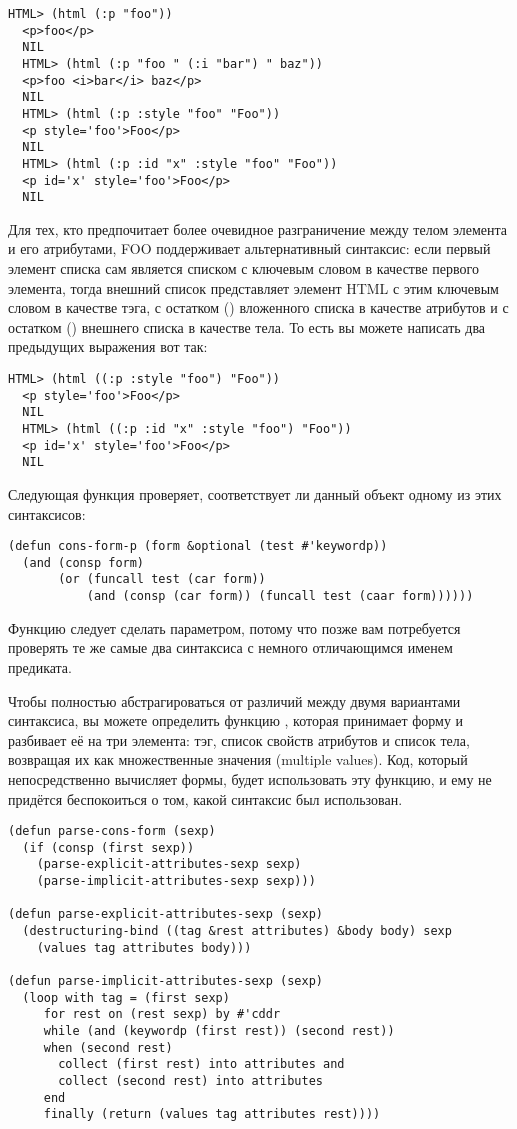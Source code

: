 \begin{lstlisting}[style=lisprepl]
  HTML> (html (:p "foo"))
  <p>foo</p>
  NIL
  HTML> (html (:p "foo " (:i "bar") " baz"))
  <p>foo <i>bar</i> baz</p>
  NIL
  HTML> (html (:p :style "foo" "Foo"))
  <p style='foo'>Foo</p>
  NIL
  HTML> (html (:p :id "x" :style "foo" "Foo"))
  <p id='x' style='foo'>Foo</p>
  NIL
\end{lstlisting}

Для тех, кто предпочитает более очевидное разграничение между телом элемента и его
атрибутами, FOO поддерживает альтернативный синтаксис: если первый элемент списка сам
является списком с ключевым словом в качестве первого элемента, тогда внешний список
представляет элемент HTML с этим ключевым словом в качестве тэга, с остатком ()
вложенного списка в качестве атрибутов и с остатком () внешнего списка в
качестве тела. То есть вы можете написать два предыдущих выражения вот так:

\begin{lstlisting}[style=lisprepl]
  HTML> (html ((:p :style "foo") "Foo"))
  <p style='foo'>Foo</p>
  NIL
  HTML> (html ((:p :id "x" :style "foo") "Foo"))
  <p id='x' style='foo'>Foo</p>
  NIL
\end{lstlisting}

Следующая функция проверяет, соответствует ли данный объект одному из этих синтаксисов:

\begin{lstlisting}
(defun cons-form-p (form &optional (test #'keywordp))
  (and (consp form)
       (or (funcall test (car form))
           (and (consp (car form)) (funcall test (caar form))))))
\end{lstlisting}

Функцию  следует сделать параметром, потому что позже вам потребуется проверять
те же самые два синтаксиса с немного отличающимся именем предиката.

Чтобы полностью абстрагироваться от различий между двумя вариантами синтаксиса, вы можете
определить функцию , которая принимает форму и разбивает её на три
элемента: тэг, список свойств атрибутов и список тела, возвращая их как множественные
значения (multiple values). Код, который непосредственно вычисляет формы, будет
использовать эту функцию, и ему не придётся беспокоиться о том, какой синтаксис был
использован.

\begin{lstlisting}
(defun parse-cons-form (sexp)
  (if (consp (first sexp))
    (parse-explicit-attributes-sexp sexp)
    (parse-implicit-attributes-sexp sexp)))

(defun parse-explicit-attributes-sexp (sexp)
  (destructuring-bind ((tag &rest attributes) &body body) sexp
    (values tag attributes body)))

(defun parse-implicit-attributes-sexp (sexp)
  (loop with tag = (first sexp)
     for rest on (rest sexp) by #'cddr
     while (and (keywordp (first rest)) (second rest))
     when (second rest)
       collect (first rest) into attributes and
       collect (second rest) into attributes
     end
     finally (return (values tag attributes rest))))
\end{lstlisting}

